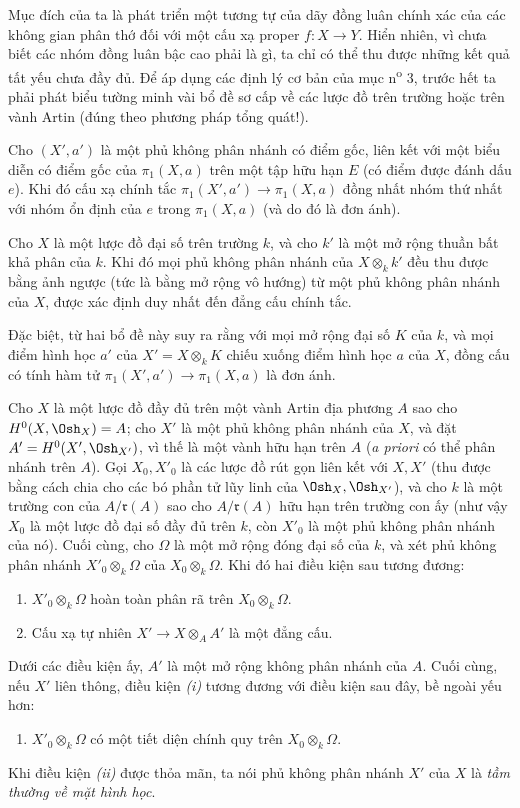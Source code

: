 Mục đích của ta là phát triển một tương tự của dãy đồng luân chính xác của các
không gian phân thớ đối với một cấu xạ proper $f:X\longrightarrow Y$. Hiển
nhiên, vì chưa biết các nhóm đồng luân bậc cao phải là gì, ta chỉ có thể thu
được những kết quả tất yếu chưa đầy đủ. Để áp dụng các định lý cơ bản của
mục n\textsuperscript{o} 3, trước hết ta phải phát biểu tường minh vài bổ đề sơ cấp về các lược đồ
trên trường hoặc trên vành Artin (đúng theo phương pháp tổng quát!).

 Cho $(X',a')$ là một phủ không phân nhánh có điểm gốc, liên
kết với một biểu diễn có điểm gốc của $\pi_1(X,a)$ trên một tập hữu hạn $E$
(có điểm được đánh dấu $e$). Khi đó cấu xạ chính tắc
$\pi_1(X',a')\longrightarrow\pi_1(X,a)$ đồng nhất nhóm thứ nhất với nhóm ổn
định của $e$ trong $\pi_1(X,a)$ (và do đó là đơn ánh).

 Cho $X$ là một lược đồ đại số trên trường $k$, và cho $k'$
là một mở rộng thuần bất khả phân của $k$. Khi đó mọi phủ không phân nhánh của
$X\otimes_k k'$ đều thu được bằng ảnh ngược (tức là bằng mở rộng vô hướng) từ
một phủ không phân nhánh của $X$, được xác định duy nhất đến đẳng cấu chính
tắc.

Đặc biệt, từ hai bổ đề này suy ra rằng với mọi mở rộng đại số $K$ của $k$, và
mọi điểm hình học $a'$ của $X'=X\otimes_k K$ chiếu xuống điểm hình học $a$ của
$X$, đồng cấu có tính hàm tử
$\pi_1(X',a')\longrightarrow\pi_1(X,a)$ là đơn ánh.

 Cho $X$ là một lược đồ đầy đủ trên một vành Artin địa phương
$A$ sao cho $H^0(X,\Osh_X)=A$; cho $X'$ là một phủ không phân nhánh của $X$,
và đặt $A'=H^0(X',\Osh_{X'})$, vì thế là một vành hữu hạn trên $A$
(\textit{a priori} có thể phân nhánh trên $A$). Gọi $X_0,X'_0$ là các lược đồ
rút gọn liên kết với $X,X'$ (thu được bằng cách chia cho các bó phần tử lũy
linh của $\Osh_X,\Osh_{X'}$), và cho $k$ là một trường con của
$A/\mathfrak r(A)$ sao cho $A/\mathfrak r(A)$ hữu hạn trên trường con ấy (như vậy
$X_0$ là một lược đồ đại số đầy đủ trên $k$, còn $X'_0$ là một phủ không phân
nhánh của nó). Cuối cùng, cho $\Omega$ là một mở rộng đóng đại số của $k$, và
xét phủ không phân nhánh $X'_0\otimes_k\Omega$ của
$X_0\otimes_k\Omega$. Khi đó hai điều kiện sau tương đương:
\begin{enumerate}
  \item[\textit{i.}] $X'_0\otimes_k\Omega$ hoàn toàn phân rã trên
    $X_0\otimes_k\Omega$.
  \item[\textit{ii.}] Cấu xạ tự nhiên
    $X'\longrightarrow X\otimes_A A'$ là một đẳng cấu.
\end{enumerate}
Dưới các điều kiện ấy, $A'$ là một mở rộng không phân nhánh của $A$. Cuối
cùng, nếu $X'$ liên thông, điều kiện \textit{(i)} tương đương với điều kiện
sau đây, bề ngoài yếu hơn:
\begin{enumerate}
  \item[\textit{i bis.}] $X'_0\otimes_k\Omega$ có một tiết diện chính quy
    trên $X_0\otimes_k\Omega$.
\end{enumerate}
Khi điều kiện \textit{(ii)} được thỏa mãn, ta nói phủ không phân nhánh $X'$
của $X$ là \emph{tầm thường về mặt hình học}.

